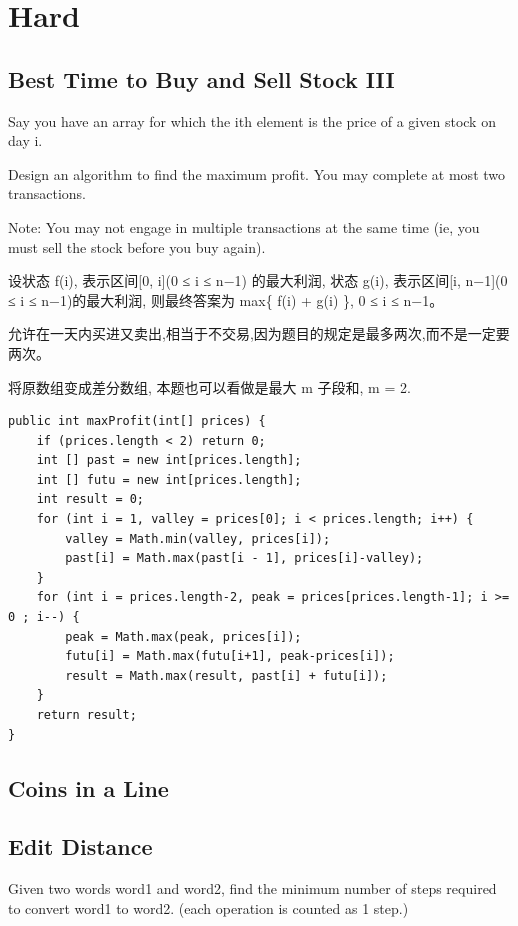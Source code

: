 \documentclass[12pt]{book}
\begin{document}
\section{Hard}
\label{sec-14-3}
\subsection{Best Time to Buy and Sell Stock III}
\label{sec-14-3-1}
Say you have an array for which the ith element is the price of a given stock on day i.

Design an algorithm to find the maximum profit. You may complete at most two transactions.

Note: You may not engage in multiple transactions at the same time (ie, you must sell the stock before you buy again).

设状态 f(i), 表示区间[0, i](0 ≤ i ≤ n−1) 的最大利润, 状态 g(i), 表示区间[i, n−1](0 ≤ i ≤ n−1)的最大利润, 则最终答案为 max\{ f(i) + g(i) \}, 0 ≤ i ≤ n−1。

允许在一天内买进又卖出,相当于不交易,因为题目的规定是最多两次,而不是一定要两次。

将原数组变成差分数组, 本题也可以看做是最大 m 子段和, m = 2.

\lstset{language=java,label= ,caption= ,numbers=none}
\begin{lstlisting}
public int maxProfit(int[] prices) {
    if (prices.length < 2) return 0; 
    int [] past = new int[prices.length];
    int [] futu = new int[prices.length];
    int result = 0;
    for (int i = 1, valley = prices[0]; i < prices.length; i++) {
        valley = Math.min(valley, prices[i]);
        past[i] = Math.max(past[i - 1], prices[i]-valley);
    }
    for (int i = prices.length-2, peak = prices[prices.length-1]; i >= 0 ; i--) {
        peak = Math.max(peak, prices[i]);
        futu[i] = Math.max(futu[i+1], peak-prices[i]);
        result = Math.max(result, past[i] + futu[i]);
    }
    return result;
}
\end{lstlisting}

\subsection{Coins in a Line}
\label{sec-14-3-2}

\subsection{Edit Distance}
\label{sec-14-3-3}
Given two words word1 and word2, find the minimum number of steps required to convert word1 to word2. (each operation is counted as 1 step.)
\end{document}
